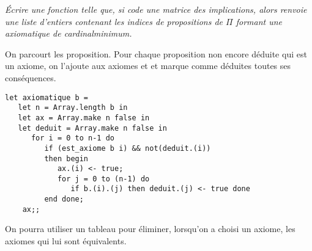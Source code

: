 \begin{Exercise}\it
Écrire une fonction  telle que, si  code une matrice des implications, alors  renvoie une liste d'entiers contenant les indices de propositions de $\Pi$ formant une axiomatique de cardinalminimum.
\end{Exercise}
\begin{Answer}

On parcourt les proposition. Pour chaque proposition non encore déduite qui est un axiome, on l'ajoute aux axiomes et et marque comme déduites toutes ses conséquences.
\begin{lstlisting}
let axiomatique b =
   let n = Array.length b in
   let ax = Array.make n false in
   let deduit = Array.make n false in
      for i = 0 to n-1 do
         if (est_axiome b i) && not(deduit.(i))
         then begin
            ax.(i) <- true;
            for j = 0 to (n-1) do
               if b.(i).(j) then deduit.(j) <- true done
         end done;
    ax;;
\end{lstlisting}
\end{Answer}
On pourra utiliser un tableau pour éliminer, lorsqu'on a choisi un axiome, les axiomes qui lui sont équivalents.



    
    
    
